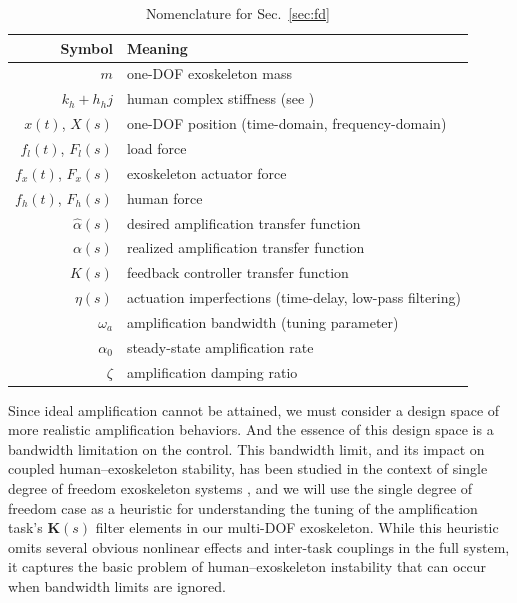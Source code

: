 \documentclass[utf8]{frontiersSCNS}
\renewcommand*{\cite}[1]{\citep{#1}}
\begin{document}
\begin{table}[tb]
	\centering
	\begin{tabular}{rl}
		\toprule
		Symbol & Meaning \\
		\midrule
		$m$  & one-DOF exoskeleton mass\\
		$k_h+h_h j$ & human complex stiffness (see \cite{HeHuangThomasSentis2020TNSRE})\\
		$x(t)$, $X(s)$ & one-DOF position (time-domain, frequency-domain)\\
		$f_l(t)$, $F_l(s)$ & load force\\
		$f_x(t)$, $F_x(s)$ & exoskeleton actuator force\\
		$f_h(t)$, $F_h(s)$ & human force\\
		$\widehat\alpha(s)$ & desired amplification transfer function\\
		$\alpha(s)$ & realized amplification transfer function\\
		$K(s)$ & feedback controller transfer function\\
		$\eta(s)$ & actuation imperfections (time-delay, low-pass filtering)\\
		$\omega_a$ & amplification bandwidth (tuning parameter)\\
		$\alpha_0$ & steady-state amplification rate\\
		$\zeta$ & amplification damping ratio\\
		\bottomrule
	\end{tabular}
	\caption{Nomenclature for Sec.~\ref{sec:fd}}
	\label{tab:not2}
\end{table}

Since ideal amplification cannot be attained, we must consider a design space of more realistic amplification behaviors. And the essence of this design space is a bandwidth limitation on the control. This bandwidth limit, and its impact on coupled human--exoskeleton stability, has been studied in the context of single degree of freedom exoskeleton systems \cite{HeThomasPaineSentis2019ACC,ThomasCoholichSentis2019AIM,HuangCappelThomasHeSentis2020ACC,HeHuangThomasSentis2020TNSRE}, and we will use the single degree of freedom case as a heuristic for understanding the tuning of the amplification task's $\mathbf K(s)$ filter elements in our multi-DOF exoskeleton. While this heuristic omits several obvious nonlinear effects and inter-task couplings in the full system, it captures the basic problem of human--exoskeleton instability that can occur when bandwidth limits are ignored.
\end{document}
